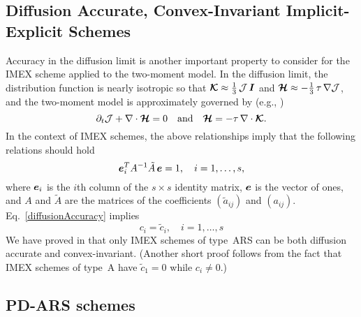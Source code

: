 \subsection{Diffusion Accurate, Convex-Invariant Implicit-Explicit Schemes}

Accuracy in the diffusion limit is another important property to consider for the IMEX scheme applied to the two-moment model.  
In the diffusion limit, the distribution function is nearly isotropic so that $\boldsymbol{\mathcal{K}}\approx\frac{1}{3}\,\mathcal{J}\,\boldsymbol{I}$ and $\boldsymbol{\mathcal{H}}\approx-\frac{1}{3}\,\tau\,\nabla\mathcal{J}$, and the two-moment model is approximately governed by (e.g., \cite{jinLevermore_1996})
\begin{equation}
  \partial_{t}{\mathcal{J}} + \nabla\cdot\boldsymbol{\mathcal{H}} = 0
  \quad\text{and}\quad
  \boldsymbol{\mathcal{H}} = - \tau\,\nabla\cdot\boldsymbol{\mathcal{K}}.  
  \label{eq:diffusionLimit}
\end{equation}
In the context of IMEX schemes, the above relationships imply that the following relations should hold~\cite{chu_etal_2018}
\begin{equation}
   \boldsymbol{e}_{i}^{T}A^{-1}\tilde{A}\,\boldsymbol{e} = 1, \quad i=1,\ldots,s,
   \label{diffusionAccuracy}
\end{equation}
where $\boldsymbol{e}_{i}$ is the $i$th column of the $s\times s$ identity matrix, $\boldsymbol{e}$ is the vector of ones, and $A$ and $\tilde{A}$ are the matrices of the coefficients $(\tilde{a}_{ij})$ and $(a_{ij})$.
Eq.~\eqref{diffusionAccuracy} implies
\begin{equation}
  c_{i} = \tilde{c}_{i}, \quad i=1,\ldots,s
\end{equation}
We have proved in \cite{chu_etal_2018} that only IMEX schemes of type~ARS can be both diffusion accurate and convex-invariant.  
(Another short proof follows from the fact that IMEX schemes of type~A have $\tilde{c}_1 = 0$ while $c_i \neq 0$.)  

\subsection{PD-ARS schemes}

